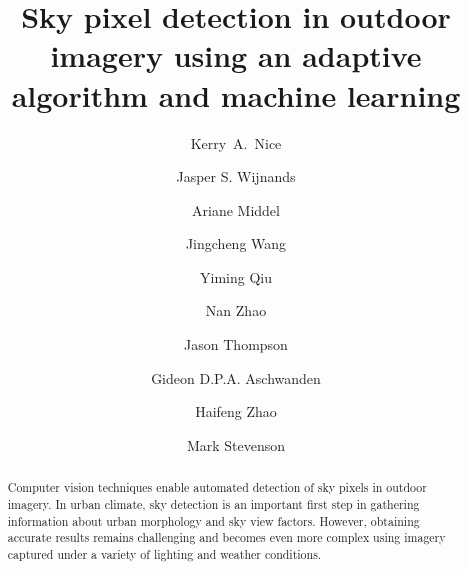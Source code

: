 \documentclass[final,3p,times,authoryear]{elsarticle}
\begin{document}
% 


\begin{frontmatter}



\title{Sky pixel detection in outdoor imagery using an adaptive algorithm and machine learning}

\author[melb,monash,crc]{Kerry~A.~Nice}
\author[melb]{Jasper S. Wijnands}
\author[asu]{Ariane Middel}
\author[cis]{Jingcheng Wang}
\author[cis]{Yiming Qiu}
\author[cis]{Nan Zhao}
\author[melb]{Jason Thompson}
\author[melb]{Gideon D.P.A. Aschwanden}
\author[melb]{Haifeng Zhao}
\author[melb,eng]{Mark Stevenson}
\address[melb]{Transport, Health, and Urban Design Hub, Faculty of Architecture, Building, and Planning, University of Melbourne, Australia.}
\address[cis]{School of Computing and Information Systems, University of Melbourne, Australia.}
\address[eng]{Melbourne School of Engineering; and Melbourne School of Population and Global Health, University of Melbourne, Australia.}
\address[monash]{School of Earth, Atmosphere and Environment, Monash University, Australia.}
\address[crc]{Cooperative Research Centre for Water Sensitive Cities, Melbourne, Australia.}
\address[asu]{School of Arts, Media and Engineering (AME), School of Computing, Informatics, and Decision Systems Engineering (CIDSE), Arizona State University.}

\begin{abstract}

Computer vision techniques enable automated detection of sky pixels in outdoor imagery. In urban climate, sky detection is an important first step in gathering information about urban morphology and sky view factors. However, obtaining accurate results remains challenging and becomes even more complex using imagery captured under a variety of lighting and weather conditions. 


\end{abstract}
\end{frontmatter}
\end{document}
